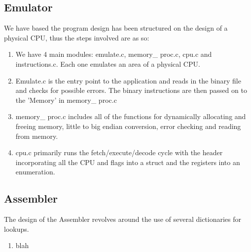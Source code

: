 \documentclass[11pt]{article}
\begin{document}
\subsection{Emulator}
We have based the program design has been structured on the design of a physical CPU, thus the steps involved are as so:
\begin{enumerate}
\item
We have 4 main modules: emulate.c, memory\_ proc.c, cpu.c and instructions.c. Each one emulates an area of a physical CPU.

\item
Emulate.c is the entry point to the application and reads in the binary file and checks for possible errors. The binary instructions are then passed on to the 'Memory' in memory\_ proc.c

\item
memory\_ proc.c includes all of the functions for dynamically allocating and freeing memory, little to big endian conversion, error checking and reading from memory.

\item
cpu.c primarily runs the fetch/execute/decode cycle with the header incorporating all the CPU and flags into a struct and the registers into an enumeration. 



\end{enumerate}

\subsection{Assembler}
The design of the Assembler revolves around the use of several dictionaries for lookups.

\begin{enumerate}

\item
blah
\end{enumerate}
\end{document}
